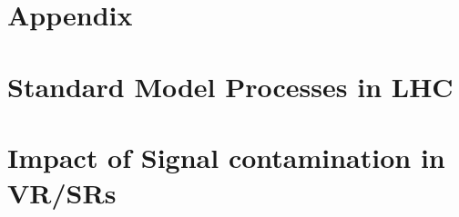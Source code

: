 \section{Appendix}
\section{Standard Model Processes in LHC}
%

%

%

\section{Impact of Signal contamination in VR/SRs}


